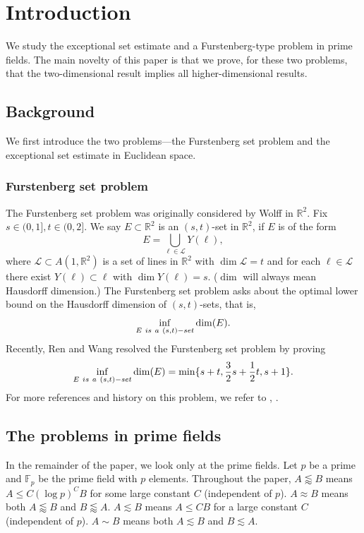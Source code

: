 \documentclass[10pt]{article}
\newcommand{\cL}{\mathcal{L}}
\newcommand{\Fp}{\mathbb{F}_p}
\newcommand{\R}{\mathbb{R}}
\begin{document}
\section{Introduction}

We study the exceptional set estimate and a Furstenberg-type problem in prime fields. The main novelty of this paper is that we prove, for these two problems, that the two-dimensional result implies all higher-dimensional results. 

\subsection{Background}

We first introduce the two problems---the Furstenberg set problem and the exceptional set estimate in Euclidean space.




\subsubsection{Furstenberg set problem}\hfill

The Furstenberg set problem was originally considered by Wolff \cite{wolff1999recent} in $\R^2$. Fix $s\in (0,1], t\in (0,2]$. We say $E\subset \R^2$ is an $(s,t)$-set in $\R^2$, if $E$ is of the form
\[ E=\bigcup_{\ell\in \cL}Y(\ell), \]
where $\cL\subset A(1,\R^2)$ is a set of lines in $\R^2$ with $\dim\cL=t$ and for each $\ell\in \cL$ there exist $Y(\ell)\subset \ell$ with $\dim Y(\ell)=s$. ($\dim$ will always mean Hausdorff dimension.) The Furstenberg set problem asks about the optimal lower bound on the Hausdorff dimension of $(s,t)$-sets, that is,
\[ \inf_{E \textup{~is~a~}(s,t)\textup{-set}}\dim(E). \]
Recently, Ren and Wang \cite{ren2023furstenberg} resolved the Furstenberg set problem by proving
\begin{equation}\label{renwang}
\inf_{E \textup{~is~a~}(s,t)\textup{-set}}\dim(E)=\min\{s+t,\frac{3}{2}s+\frac{1}{2}t,s+1  \}.
\end{equation} 
For more references and history on this problem, we refer to \cite{ren2023furstenberg}, \cite{orponen2023projections}. 
\setcounter{theorem}{1}\setcounter{equation}{2}\setcounter{subsection}{1}
\subsection{The problems in prime fields}
In the remainder of the paper, we look only at the prime fields. Let $p$ be a prime and $\Fp$ be the prime field with $p$ elements. Throughout the paper, $A\lessapprox B$ means $A\le  C (\log p)^{C} B$ for some large constant $C$ (independent of $p$). $A\approx B$ means both $A\lessapprox B$ and $B\lessapprox A$.  $A\lesssim B$ means $A\le C B$ for a large constant $C$ (independent of $p$). $A\sim B$ means both $A\lesssim B$ and $B\lesssim A$. 
\end{document}

